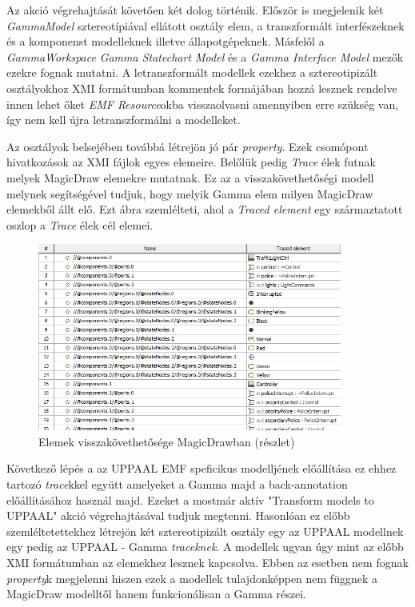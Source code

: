Az akció végrehajtását követően két dolog történik. Először is megjelenik két \emph{GammaModel} sztereotípiával ellátott osztály elem, a transzformált interfészeknek és a komponenst modelleknek illetve állapotgépeknek. Másfelől a \emph{GammaWorkspace} \emph{Gamma Statechart Model} és a \emph{Gamma Interface Model} mezők ezekre fognak mutatni. A letranszformált modellek ezekhez a sztereotipizált osztályokhoz XMI formátumban kommentek formájában hozzá lesznek rendelve innen lehet őket \emph{EMF Resource}okba visszaolvasni amennyiben erre szükség van, így nem kell újra letranszformálni a modelleket.

Az osztályok belsejében továbbá létrejön jó pár \emph{property}. Ezek csomópont hivatkozások az XMI fájlok egyes elemeire. Belőlük pedig \emph{Trace} élek futnak melyek MagicDraw elemekre mutatnak. Ez az a visszakövethetőségi modell melynek segítségével tudjuk, hogy melyik Gamma elem milyen MagicDraw elemekből állt elő. Ezt  ábra szemlélteti, ahol a \emph{Traced element} egy származtatott oszlop a \emph{Trace} élek cél elemei.

\begin{figure}[!ht]
	\centering
	\includegraphics[width=10cm, keepaspectratio]{figures/contribution/Traces.png}
	\caption{Elemek visszakövethetősége MagicDrawban (részlet)}
	\label{fig:traces}
\end{figure}

Következő lépés a az UPPAAL EMF speficikus modelljének előállítása  ez ehhez tartozó \emph{trace}kkel együtt amelyeket a Gamma majd a back-annotation előállításához használ majd. Ezeket a mostmár aktív "Transform models to UPPAAL" akció végrehajtásával tudjuk megtenni. Hasonlóan ez előbb szemléltetettekhez létrejön két sztereotipizált osztály egy az UPPAAL modellnek egy pedig az UPPAAL - Gamma \emph{traceknek}. A modellek ugyan úgy mint az előbb XMI formátumban az elemekhez lesznek kapcsolva. Ebben az esetben nem fognak \emph{property}k megjelenni hiszen ezek a modellek tulajdonképpen nem függnek a MagicDraw modelltől hanem funkcionálisan a Gamma részei.

